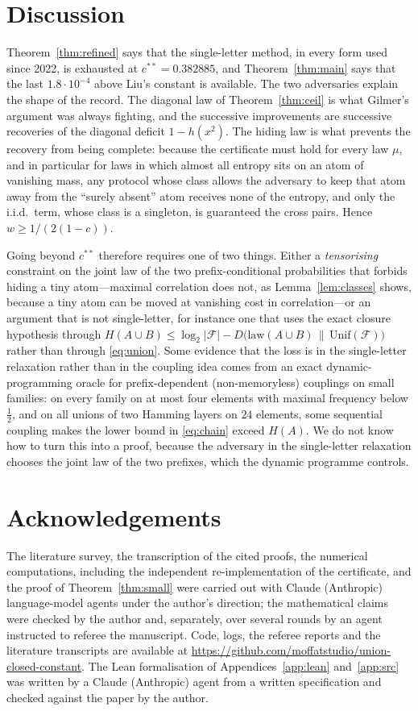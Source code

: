 \documentclass[11pt,a4paper]{article}
\theoremstyle{definition}
\theoremstyle{remark}
\newcommand{\F}{\mathcal{F}}
\newcommand{\ent}{h}
\begin{document}
\section{Discussion}\label{sec:discussion}
Theorem~\ref{thm:refined} says that the single-letter method, in every form used since 2022, is exhausted at $c^{**}=0.382885$, and Theorem~\ref{thm:main} says that the last $1.8\cdot10^{-4}$ above Liu's constant is available. The two adversaries explain the shape of the record. The diagonal law of Theorem~\ref{thm:ceil} is what Gilmer's argument was always fighting, and the successive improvements are successive recoveries of the diagonal deficit $1-\ent(x^2)$. The hiding law is what prevents the recovery from being complete: because the certificate must hold for every law $\mu$, and in particular for laws in which almost all entropy sits on an atom of vanishing mass, any protocol whose class allows the adversary to keep that atom away from the ``surely absent'' atom receives none of the entropy, and only the i.i.d.\ term, whose class is a singleton, is guaranteed the cross pairs. Hence $w\ge1/(2(1-c))$.

Going beyond $c^{**}$ therefore requires one of two things. Either a \emph{tensorising} constraint on the joint law of the two prefix-conditional probabilities that forbids hiding a tiny atom---maximal correlation does not, as Lemma~\ref{lem:classes} shows, because a tiny atom can be moved at vanishing cost in correlation---or an argument that is not single-letter, for instance one that uses the exact closure hypothesis through $H(A\cup B)\le\log_2|\F|-D\big(\mathrm{law}(A\cup B)\,\|\,\mathrm{Unif}(\F)\big)$ rather than through \eqref{eq:union}. Some evidence that the loss is in the single-letter relaxation rather than in the coupling idea comes from an exact dynamic-programming oracle for prefix-dependent (non-memoryless) couplings on small families: on every family on at most four elements with maximal frequency below $\frac12$, and on all unions of two Hamming layers on $24$ elements, some sequential coupling makes the lower bound in \eqref{eq:chain} exceed $H(A)$. We do not know how to turn this into a proof, because the adversary in the single-letter relaxation chooses the joint law of the two prefixes, which the dynamic programme controls.

\section*{Acknowledgements}
The literature survey, the transcription of the cited proofs, the numerical computations, including the independent re-implementation of the certificate, and the proof of Theorem~\ref{thm:small} were carried out with Claude (Anthropic) language-model agents under the author's direction; the mathematical claims were checked by the author and, separately, over several rounds by an agent instructed to referee the manuscript. Code, logs, the referee reports and the literature transcripts are available at \url{https://github.com/moffatstudio/union-closed-constant}. The Lean formalisation of Appendices~\ref{app:lean} and~\ref{app:src} was written by a Claude (Anthropic) agent from a written specification and checked against the paper by the author.
\end{document}
